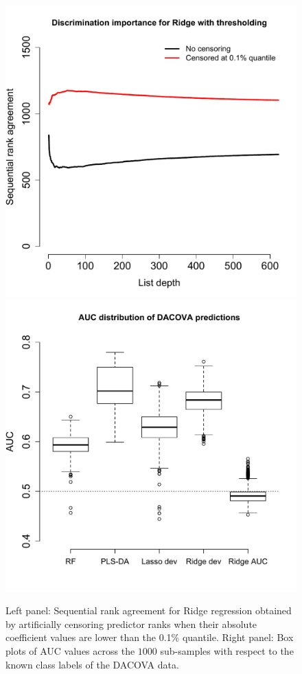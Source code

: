 \documentclass[oupdraft]{bio}
\begin{document}
\begin{figure}[htbp]
\begin{center}
\includegraphics[width=.49\textwidth]{pics/ridgeCensoring}%
\includegraphics[width=.49\textwidth]{pics/aucPlot}
\end{center}
\caption{Left panel: Sequential rank agreement for Ridge regression
  obtained by artificially censoring predictor ranks when their absolute
  coefficient values are lower than the 0.1\% quantile. Right panel:
  Box plots of AUC values across the $1000$ sub-samples with respect
  to the known class labels of the DACOVA data.}
 \label{fig:app2}
\end{figure}

\newpage
\end{document}
